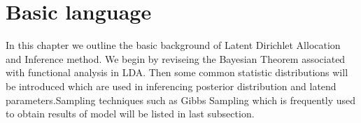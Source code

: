 \chapter{Basic language}
In this chapter we outline the basic background of Latent Dirichlet Allocation and Inference method. We begin by reviseing the Bayesian Theorem
associated with functional analysis in LDA. Then some common statistic distributions
 will be introduced which are used in inferencing posterior distribution and latend parameters.Sampling techniques such as Gibbs Sampling which is frequently used to obtain results of model will be listed in last subsection.
